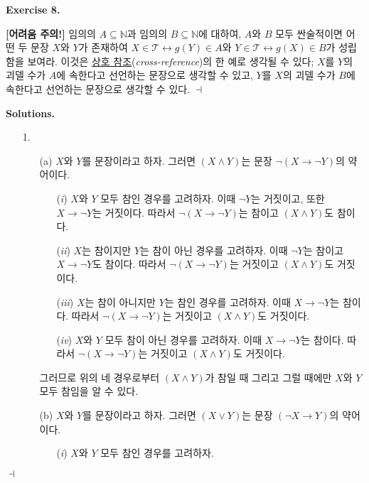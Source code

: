 \documentclass[12pt]{paper}
\newenvironment{context}[1][]
{ \noindent \textbf{{#1}.}
}
{ \hfill $ \dashv $
}
\begin{document}
\begin{context}[Exercise 8]
\textbf{[어려움 주의!]} 임의의 $A \subseteq \mathbb{N}$과 임의의 $B \subseteq \mathbb{N}$에 대하여,
$A$와 $B$ 모두 싼술적이면 어떤 두 문장 $X$와 $Y$가 존재하여 $X \in \mathcal{T} \leftrightarrow g \left( Y \right) \in A$와 $Y \in \mathcal{T} \leftrightarrow g \left( X \right) \in B$가 성립함을 보여라.
이것은 \underline{상호 참조}(\textit{cross-reference})의 한 예로 생각될 수 있다;
$X$를 $Y$의 괴델 수가 $A$에 속한다고 선언하는 문장으로 생각할 수 있고,
$Y$를 $X$의 괴델 수가 $B$에 속한다고 선언하는 문장으로 생각할 수 있다.
\end{context}

\begin{context}[Solutions]
\begin{enumerate}
\item[{1.}]
\begin{itemize}
\item[(a)] $X$와 $Y$를 문장이라고 하자.
그러면 $\left( X \land Y \right)$는 문장 $\lnot \left( X \rightarrow \lnot Y \right)$의 약어이다.
\begin{enumerate}
\item[(\textit{i})] $X$와 $Y$ 모두 참인 경우를 고려하자.
이때 $\lnot Y$는 거짓이고, 또한 $X \rightarrow \lnot Y$는 거짓이다.
따라서 $\lnot \left( X \rightarrow \lnot Y \right)$는 참이고 $\left( X \land Y \right)$도 참이다.
\item[(\textit{ii})] $X$는 참이지만 $Y$는 참이 아닌 경우를 고려하자.
이때 $\lnot Y$는 참이고 $X \rightarrow \lnot Y$도 참이다.
따라서 $\lnot \left( X \rightarrow \lnot Y \right)$는 거짓이고 $\left( X \land Y \right)$도 거짓이다.
\item[(\textit{iii})] $X$는 참이 아니지만 $Y$는 참인 경우를 고려하자.
이때 $X \rightarrow \lnot Y$는 참이다.
따라서 $\lnot \left( X \rightarrow \lnot Y \right)$는 거짓이고 $\left( X \land Y \right)$도 거짓이다.
\item[(\textit{iv})] $X$와 $Y$ 모두 참이 아닌 경우를 고려하자.
이때 $X \rightarrow \lnot Y$는 참이다.
따라서 $\lnot \left( X \rightarrow \lnot Y \right)$는 거짓이고 $\left( X \land Y \right)$도 거짓이다.
\end{enumerate}
그러므로 위의 네 경우로부터 $\left( X \land Y \right)$가 참일 때 그리고 그럴 때에만 $X$와 $Y$ 모두 참임을 알 수 있다.
\item[(b)] $X$와 $Y$를 문장이라고 하자.
그러면 $\left( X \lor Y \right)$는 문장 $\left( \lnot X \rightarrow Y \right)$의 약어이다.
\begin{enumerate}
\item[(\textit{i})] $X$와 $Y$ 모두 참인 경우를 고려하자.

\end{enumerate}
\end{itemize}
\end{enumerate}
\end{context}
\end{document}
